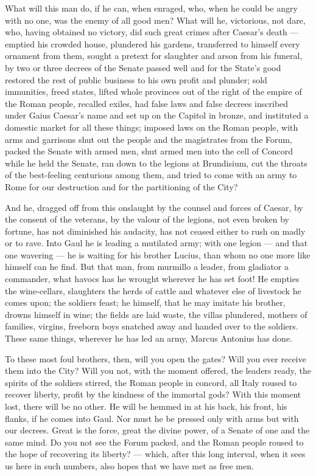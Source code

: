  What will this man do, if he can, when enraged, who, when he could be angry with no one, was the enemy of all good men? What will he, victorious, not dare, who, having obtained no victory, did such great crimes after Caesar's death --- emptied his crowded house, plundered his gardens, transferred to himself every ornament from them, sought a pretext for slaughter and arson from his funeral, by two or three decrees of the Senate passed well and for the State's good restored the rest of public business to his own profit and plunder; sold immunities, freed states, lifted whole provinces out of the right of the empire of the Roman people, recalled exiles, had false laws and false decrees inscribed under Gaius Caesar's name and set up on the Capitol in bronze, and instituted a domestic market for all these things; imposed laws on the Roman people, with arms and garrisons shut out the people and the magistrates from the Forum, packed the Senate with armed men, shut armed men into the cell of Concord while he held the Senate, ran down to the legions at Brundisium, cut the throats of the best-feeling centurions among them, and tried to come with an army to Rome for our destruction and for the partitioning of the City?

 And he, dragged off from this onslaught by the counsel and forces of Caesar, by the consent of the veterans, by the valour of the legions, not even broken by fortune, has not diminished his audacity, has not ceased either to rush on madly or to rave. Into Gaul he is leading a mutilated army; with one legion --- and that one wavering --- he is waiting for his brother Lucius, than whom no one more like himself can he find. But that man, from murmillo a leader, from gladiator a commander, what havocs has he wrought wherever he has set foot! He empties the wine-cellars, slaughters the herds of cattle and whatever else of livestock he comes upon; the soldiers feast; he himself, that he may imitate his brother, drowns himself in wine; the fields are laid waste, the villas plundered, mothers of families, virgins, freeborn boys snatched away and handed over to the soldiers. These same things, wherever he has led an army, Marcus Antonius has done.

 To these most foul brothers, then, will you open the gates? Will you ever receive them into the City? Will you not, with the moment offered, the leaders ready, the spirits of the soldiers stirred, the Roman people in concord, all Italy roused to recover liberty, profit by the kindness of the immortal gods? With this moment lost, there will be no other. He will be hemmed in at his back, his front, his flanks, if he comes into Gaul. Nor must he be pressed only with arms but with our decrees. Great is the force, great the divine power, of a Senate of one and the same mind. Do you not see the Forum packed, and the Roman people roused to the hope of recovering its liberty? --- which, after this long interval, when it sees us here in such numbers, also hopes that we have met as free men.

